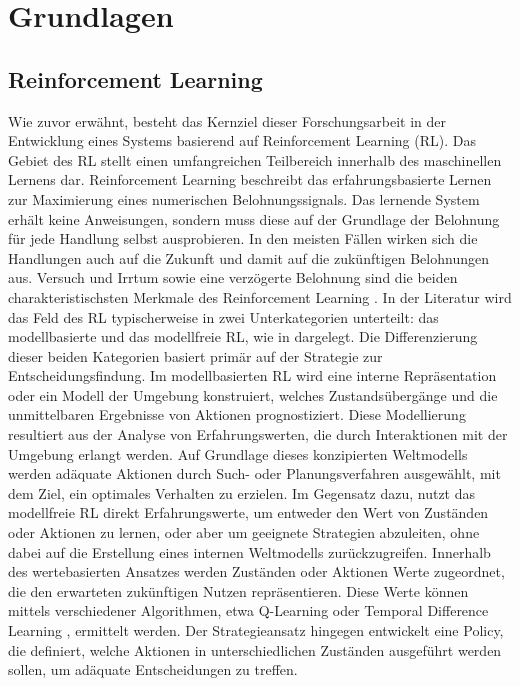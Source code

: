 \documentclass[a4paper, 11pt]{article}
\begin{document}
\section{Grundlagen}
\subsection{Reinforcement Learning}
Wie zuvor erwähnt, besteht das Kernziel dieser Forschungsarbeit in der Entwicklung eines Systems basierend auf Reinforcement Learning (RL). Das Gebiet des RL stellt einen umfangreichen Teilbereich innerhalb des maschinellen Lernens dar. Reinforcement Learning beschreibt das erfahrungsbasierte Lernen zur Maximierung eines numerischen Belohnungssignals. Das lernende System erhält keine Anweisungen, sondern muss diese auf der Grundlage der Belohnung für jede Handlung selbst ausprobieren. In den meisten Fällen wirken sich die Handlungen auch auf die Zukunft und damit auf die zukünftigen Belohnungen aus. Versuch und Irrtum sowie eine verzögerte Belohnung sind die beiden charakteristischsten Merkmale des Reinforcement Learning \cite[S. 23]{sutton_reinforcement_2018}.
In der Literatur wird das Feld des RL typischerweise in zwei Unterkategorien unterteilt: das modellbasierte und das modellfreie RL, wie in \cite[S. 181]{sutton_reinforcement_2018} dargelegt. Die Differenzierung dieser beiden Kategorien basiert primär auf der Strategie zur Entscheidungsfindung.
Im modellbasierten RL wird eine interne Repräsentation oder ein Modell der Umgebung konstruiert, welches Zustandsübergänge und die unmittelbaren Ergebnisse von Aktionen prognostiziert. Diese Modellierung resultiert aus der Analyse von Erfahrungswerten, die durch Interaktionen mit der Umgebung erlangt werden. Auf Grundlage dieses konzipierten Weltmodells werden adäquate Aktionen durch Such- oder Planungsverfahren ausgewählt, mit dem Ziel, ein optimales Verhalten zu erzielen.
Im Gegensatz dazu, nutzt das modellfreie RL direkt Erfahrungswerte, um entweder den Wert von Zuständen oder Aktionen zu lernen, oder aber um geeignete Strategien abzuleiten, ohne dabei auf die Erstellung eines internen Weltmodells zurückzugreifen. Innerhalb des wertebasierten Ansatzes werden Zuständen oder Aktionen Werte zugeordnet, die den erwarteten zukünftigen Nutzen repräsentieren. Diese Werte können mittels verschiedener Algorithmen, etwa Q-Learning \cite{watkins_q-learning_1992} oder Temporal Difference Learning \cite{tesauro_temporal_1995}, ermittelt werden. Der Strategieansatz hingegen entwickelt eine Policy, die definiert, welche Aktionen in unterschiedlichen Zuständen ausgeführt werden sollen, um adäquate Entscheidungen zu treffen.
\end{document}
